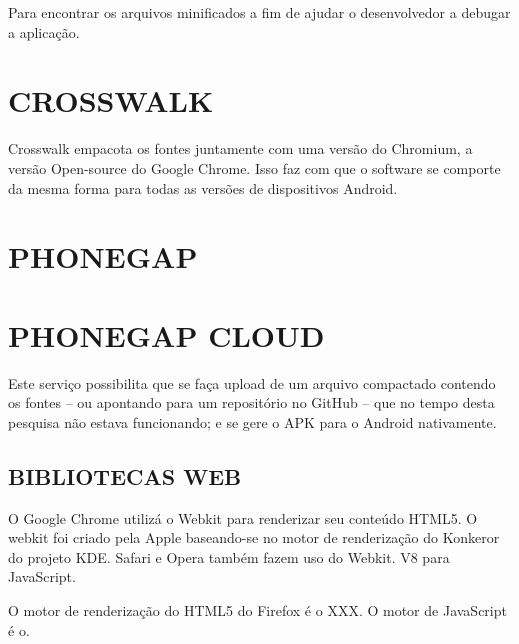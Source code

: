 \documentclass[
12pt,
a4paper,
portuges,
draft
]{report}
\begin{document}
Para encontrar os arquivos minificados a fim de ajudar o desenvolvedor a
debugar a aplicação.


\section{CROSSWALK}
Crosswalk empacota os fontes juntamente com uma versão do Chromium, a
versão Open-source do Google Chrome. Isso faz com que o software se
comporte da mesma forma para todas as versões de dispositivos Android.

\section{PHONEGAP}
\section{PHONEGAP CLOUD}

Este serviço possibilita que se faça upload de um arquivo compactado
contendo os fontes – ou apontando para um repositório no GitHub –
que no tempo desta pesquisa não estava funcionando; e se gere o APK
para o Android nativamente.


\subsection{BIBLIOTECAS WEB}

O Google Chrome utilizá o Webkit para renderizar seu conteúdo HTML5. O
webkit foi criado pela Apple baseando-se no motor de renderização do
Konkeror do projeto KDE. Safari e Opera também fazem uso do Webkit. V8
para JavaScript.

O motor de renderização do HTML5 do Firefox é o XXX. O motor de
JavaScript é o.
\end{document}
